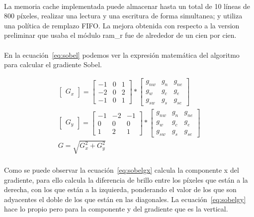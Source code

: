 \documentclass[a4paper,12pt,titlepage,final]{book}
\begin{document}
\paragraph{}
La memoria cache implementada puede almacenar hasta un total de 10 líneas de 800 píxeles, realizar una lectura y una escritura de forma simultanea; y utiliza una política de remplazo FIFO. La mejora obtenida con respecto a la version preliminar que usaba el módulo ram\_r fue de alrededor de un cien por cien.

\paragraph{}
En la ecuación~\ref{eq:sobel} podemos ver la expresión matemática del algoritmo para calcular el gradiente Sobel.

\begin{subequations}\label{eq:sobel}
\begin{align}
\begin{bmatrix}
G_x
\end{bmatrix}=
\begin{bmatrix}
-1 & 0 & 1\\
-2 & 0 & 2\\
-1 & 0 & 1
\end{bmatrix}*
\begin{bmatrix}
g_{nw} & g_n & g_{ne}\\
g_w & g_c & g_e\\
g_{sw} & g_s & g_{se}
\end{bmatrix}\label{eq:sobelgx}\\
\begin{bmatrix}
G_y
\end{bmatrix}=
\begin{bmatrix}
-1 & -2 & -1\\
0 & 0 & 0\\
1 & 2 & 1
\end{bmatrix}*
\begin{bmatrix}
g_{nw} & g_n & g_{ne}\\
g_w & g_c & g_e\\
g_{sw} & g_s & g_{se}
\end{bmatrix}\label{eq:sobelgy}\\
G=\sqrt{G_x^2 + G_y^2}\label{eq:sobelg}
\end{align}
\end{subequations}

\paragraph{}
Como se puede observar la ecuación~\ref{eq:sobelgx} calcula la componente x del gradiente, para ello calcula la diferencia de brillo entre los píxeles que están a la derecha, con los que están a la izquierda, ponderando el valor de los que son adyacentes el doble de los que están en las diagonales. La ecuación~\ref{eq:sobelgy} hace lo propio pero para la componente y del gradiente que es la vertical.
\end{document}
